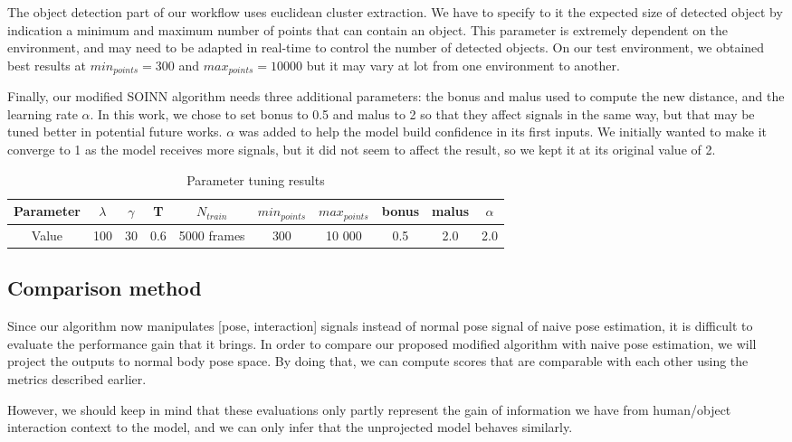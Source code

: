The object detection part of our workflow uses euclidean cluster extraction. We have to specify to it the expected size of detected object by indication a minimum and maximum number of points that can contain an object. This parameter is extremely dependent on the environment, and may need to be adapted in real-time to control the number of detected objects. On our test environment, we obtained best results at $min_{points}=300$ and $max_{points}=10000$ but it may vary at lot from one environment to another.

Finally, our modified SOINN algorithm needs three additional parameters: the bonus and malus used to compute the new distance, and the learning rate $\alpha$. In this work, we chose to set bonus to 0.5 and malus to 2 so that they affect signals in the same way, but that may be tuned better in potential future works. $\alpha$ was added to help the model build confidence in its first inputs. We initially wanted to make it converge to 1 as the model receives more signals, but it did not seem to affect the result, so we kept it at its original value of 2.

\begin{table}[hp]
\centering
\caption{Parameter tuning results}
\label{tab:parameters}
\begin{tabular}{|c|c|c|c|c|c|c|c|c|c|}
    \hline
    Parameter & $\lambda$ & $\gamma$ & T & $N_{train}$ & $min_{points}$ & $max_{points}$ & bonus & malus & $\alpha$ \\
    \hline
    Value & 100 & 30 & 0.6 & 5000 frames & 300 & 10 000 & 0.5 & 2.0 & 2.0 \\
    \hline
\end{tabular}
\end{table}

\subsection{Comparison method}
Since our algorithm now manipulates [pose, interaction] signals instead of normal pose signal of naive pose estimation, it is difficult to evaluate the performance gain that it brings. In order to compare our proposed modified algorithm with naive pose estimation, we will project the outputs to normal body pose space. By doing that, we can compute scores that are comparable with each other using the metrics described earlier. 

However, we should keep in mind that these evaluations only partly represent the gain of information we have from human/object interaction context to the model, and we can only infer that the unprojected model behaves similarly.

